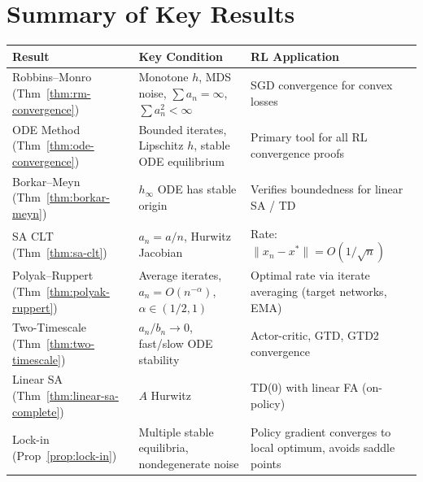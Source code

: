 \documentclass[11pt,a4paper]{article}
\theoremstyle{definition}
\theoremstyle{plain}
\theoremstyle{remark}
\begin{document}
\section{Summary of Key Results}
\label{sec:summary}

\begin{center}
\renewcommand{\arraystretch}{1.4}
\begin{tabular}{@{}p{3.8cm}p{4cm}p{5.5cm}@{}}
\toprule
\textbf{Result} & \textbf{Key Condition} & \textbf{RL Application} \\
\midrule
Robbins--Monro (Thm~\ref{thm:rm-convergence})
  & Monotone $h$, MDS noise, $\sum a_n = \infty$, $\sum a_n^2 < \infty$
  & SGD convergence for convex losses \\
\addlinespace
ODE Method (Thm~\ref{thm:ode-convergence})
  & Bounded iterates, Lipschitz $h$, stable ODE equilibrium
  & Primary tool for all RL convergence proofs \\
\addlinespace
Borkar--Meyn (Thm~\ref{thm:borkar-meyn})
  & $h_\infty$ ODE has stable origin
  & Verifies boundedness for linear SA / TD \\
\addlinespace
SA CLT (Thm~\ref{thm:sa-clt})
  & $a_n = a/n$, Hurwitz Jacobian
  & Rate: $\|x_n - x^*\| = O(1/\sqrt{n})$ \\
\addlinespace
Polyak--Ruppert (Thm~\ref{thm:polyak-ruppert})
  & Average iterates, $a_n = O(n^{-\alpha})$, $\alpha \in (1/2,1)$
  & Optimal rate via iterate averaging (target networks, EMA) \\
\addlinespace
Two-Timescale (Thm~\ref{thm:two-timescale})
  & $a_n/b_n \to 0$, fast/slow ODE stability
  & Actor-critic, GTD, GTD2 convergence \\
\addlinespace
Linear SA (Thm~\ref{thm:linear-sa-complete})
  & $A$ Hurwitz
  & TD(0) with linear FA (on-policy) \\
\addlinespace
Lock-in (Prop~\ref{prop:lock-in})
  & Multiple stable equilibria, nondegenerate noise
  & Policy gradient converges to local optimum, avoids saddle points \\
\bottomrule
\end{tabular}
\end{center}

\bigskip
\end{document}
